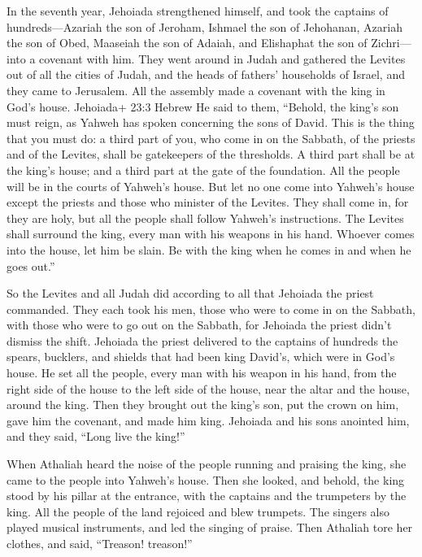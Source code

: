  In the seventh year, Jehoiada strengthened himself, and
took the captains of hundreds---Azariah the son of Jeroham, Ishmael the
son of Jehohanan, Azariah the son of Obed, Maaseiah the son of Adaiah,
and Elishaphat the son of Zichri---into a covenant with him.
 They went around in Judah and gathered the Levites out of
all the cities of Judah, and the heads of fathers' households of Israel,
and they came to Jerusalem.  All the assembly made a
covenant with the king in God's house. Jehoiada+ 23:3 Hebrew He said to
them, ``Behold, the king's son must reign, as Yahweh has spoken
concerning the sons of David.  This is the thing that you
must do: a third part of you, who come in on the Sabbath, of the priests
and of the Levites, shall be gatekeepers of the thresholds. 
A third part shall be at the king's house; and a third part at the gate
of the foundation. All the people will be in the courts of Yahweh's
house.  But let no one come into Yahweh's house except the
priests and those who minister of the Levites. They shall come in, for
they are holy, but all the people shall follow Yahweh's instructions.
 The Levites shall surround the king, every man with his
weapons in his hand. Whoever comes into the house, let him be slain. Be
with the king when he comes in and when he goes out.''

 So the Levites and all Judah did according to all that
Jehoiada the priest commanded. They each took his men, those who were to
come in on the Sabbath, with those who were to go out on the Sabbath,
for Jehoiada the priest didn't dismiss the shift.  Jehoiada
the priest delivered to the captains of hundreds the spears, bucklers,
and shields that had been king David's, which were in God's house.
 He set all the people, every man with his weapon in his
hand, from the right side of the house to the left side of the house,
near the altar and the house, around the king.  Then they
brought out the king's son, put the crown on him, gave him the covenant,
and made him king. Jehoiada and his sons anointed him, and they said,
``Long live the king!''

 When Athaliah heard the noise of the people running and
praising the king, she came to the people into Yahweh's house.
 Then she looked, and behold, the king stood by his pillar
at the entrance, with the captains and the trumpeters by the king. All
the people of the land rejoiced and blew trumpets. The singers also
played musical instruments, and led the singing of praise. Then Athaliah
tore her clothes, and said, ``Treason! treason!''


